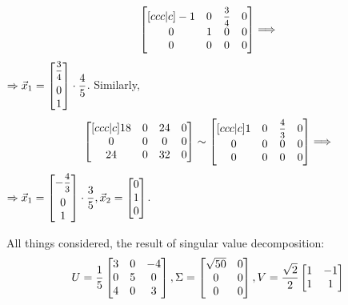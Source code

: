 \begin{solution}
\[\begin{bmatrix}[ccc|c]
            -1 & 0 & \medmath{\frac{3}{4}} & 0\\
            0 & 1 & 0 & 0\\
            0 & 0 & 0 & 0
        \end{bmatrix} \Longrightarrow
    \]
    $\Rightarrow \vec x_1 = \begin{bmatrix}
        \medmath{\frac{3}{4}} \\[0.2cm] 0 \\ 1
    \end{bmatrix} \cdot \dfrac{4}{5}$. Similarly, 
    \[
        \begin{bmatrix}[ccc|c]
            18 & 0 & 24 & 0\\
            0 & 0 & 0 & 0\\
            24 & 0 & 32 & 0
        \end{bmatrix}  \sim \begin{bmatrix}[ccc|c]
            1 & 0 & \medmath{\frac{4}{3}} & 0\\
            0 & 0 & 0 & 0\\
            0 & 0 & 0 & 0
        \end{bmatrix} \Longrightarrow 
    \]
    $\Rightarrow \vec x_1 = \begin{bmatrix}
        -\medmath{\frac{4}{3}} \\[0.2cm]
        0 \\
         1
    \end{bmatrix} \cdot \dfrac{3}{5}, \vec x_2 = \begin{bmatrix}
        0 \\ 1 \\ 0
    \end{bmatrix}$.
    \par 
    All things considered, the result of singular value decomposition:
    \[
        U = \dfrac{1}{5}\begin{bmatrix}
            3 & 0 & -4\\
            0 & 5 & 0\\
            4 & 0 & 3
        \end{bmatrix}, \vspace*{0.5cm} \Sigma = \begin{bmatrix}
            \sqrt{50} & 0\\
            0 & 0\\
            0 & 0
        \end{bmatrix}, \vspace*{0.5cm} V = \frac{\sqrt{2}}{2} \begin{bmatrix}
            1 & -1 \\
            1 & 1
        \end{bmatrix}  
    \]
\end{solution}